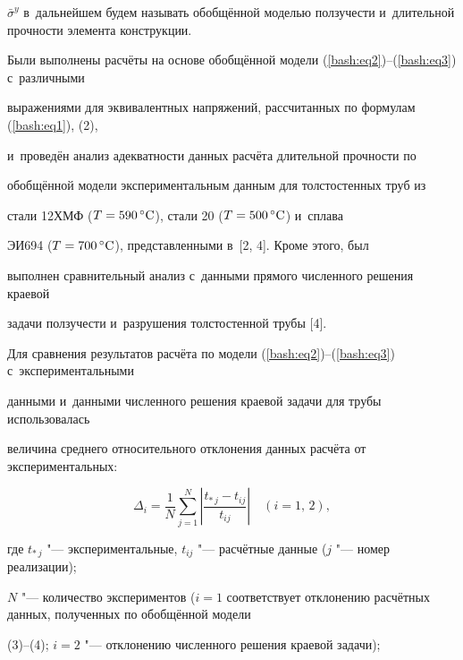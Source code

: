 $\bar {\sigma }^y$ в~дальнейшем будем называть обобщённой моделью ползучести и~длительной прочности элемента конструкции. 



Были выполнены расчёты на основе обобщённой модели (\ref{bash:eq2})--(\ref{bash:eq3}) с~различными 

выражениями для эквивалентных напряжений, рассчитанных по формулам (\ref{bash:eq1}), (2), 

и~проведён анализ адекватности данных расчёта длительной прочности по 

обобщённой модели экспериментальным данным для толстостенных труб из 

стали 12ХМФ ($T=590\,{}^\circ \rm C$), стали 20 ($T=500\,{}^\circ \rm C$) и~сплава 

ЭИ694 ($T=700\,{}^\circ \rm C$), представленными в~[2, 4]. Кроме этого, был 

выполнен сравнительный анализ с~данными прямого численного решения краевой 

задачи ползучести и~разрушения толстостенной трубы [4].



Для сравнения результатов расчёта по модели (\ref{bash:eq2})--(\ref{bash:eq3}) с~экспериментальными 

данными и~данными численного решения краевой задачи для трубы использовалась 

величина среднего относительного отклонения данных расчёта от экспериментальных:



\vspace{-2mm}

$$

\Delta _i = \frac{1}{N}\sum\limits_{j = 1}^N {\left| {\frac{t_{ * \,j} - 

t_{ij} }{t_{ij} }} \right|}\quad  (i=1,\,2), 

$$

\vspace{-2mm}



\noindent

где $t_{ *\, j} $ "--- экспериментальные, $t_{ij} $ "--- расчётные данные ($j$ "--- номер реализации); 

$N$ "--- количество экспериментов ($i=1$ соответствует отклонению  расчётных данных, полученных по  обобщённой модели

(3)--(4); $i=2$ "--- отклонению  численного решения краевой задачи); 



